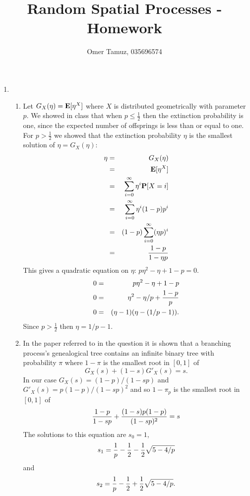 \documentclass[11pt]{article} \usepackage{amssymb}
\newcommand{\E}{{\bf E}} \newcommand{\Cov}{{\bf Cov}}
\newcommand{\half}{{\textstyle \frac12}}
\begin{document}
\title{Random Spatial Processes - Homework}

 \author{Omer Tamuz, 035696574}
\maketitle


\begin{enumerate}
  \item
  \begin{enumerate}
  \item Let $G_X(\eta)=\E[\eta^X]$ where $X$ is distributed geometrically with
    parameter $p$. We showed in class that when $p \leq \half$ then the 
    extinction probability is one,
    since the expected number of offsprings is less than or equal to one.
    For $p>\half$ we showed that the extinction probability $\eta$ is
    the smallest solution of $\eta=G_X(\eta)$:
    \begin{eqnarray*}
      \eta &=& G_X(\eta)
      \\ &=& \E[\eta^X]
      \\ &=& \sum_{i=0}^\infty \eta^i\P[X=i]
      \\ &=& \sum_{i=0}^\infty \eta^i(1-p)p^i
      \\ &=& (1-p)\sum_{i=0}^\infty (\eta p)^i
      \\ &=& {1-p \over 1 - \eta p}
    \end{eqnarray*}
    This gives a quadratic equation on $\eta$: $p\eta^2-\eta+1-p=0$.
    \begin{eqnarray*}
      0 &=& p\eta^2-\eta+1-p
      \\ 0 &=& \eta^2-\eta/p+{1-p \over p}
      \\ 0 &=& (\eta-1)(\eta-(1/p-1)).
    \end{eqnarray*}
    Since $p>\half$ then $\eta=1/p-1$.
  \item
    In the paper referred to in the question it is shown that a branching
    process's genealogical tree contains an infinite binary tree with
    probability $\pi$ where $1-\pi$ is the smallest root in $[0,1]$ of
    $$G_X(s)+(1-s)G'_X(s)=s.$$
    In our case $G_X(s)=(1-p)/(1-sp)$ and $G'_X(s)=p(1-p)/(1-sp)^2$ 
    and so $1-\pi_p$ is the smallest root in $[0,1]$ of
    \begin{eqnarray*}
      {1-p \over 1-sp}+{(1-s)p(1-p)\over (1-sp)^2}=s
    \end{eqnarray*}
    The solutions to this equation are $s_0=1$,
    $$s_1={1\over p}-{1\over 2}-{1\over 2}\sqrt{5-4/p}$$
    and
    $$s_2={1\over p}-{1\over 2}+{1\over 2}\sqrt{5-4/p}.$$
    

\end{enumerate}
\end{enumerate}
\end{document}
